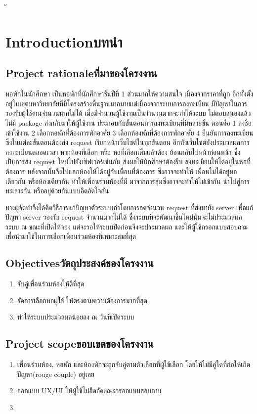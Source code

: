 ั\chapter{\ifenglish Introduction\else บทนำ\fi}

\section{\ifenglish Project rationale\else ที่มาของโครงงาน\fi}

หอพักในนักศึกษา เป็นหอพักที่นักศึกษาชั้นปีที่ 1 ส่วนมากให้ความสนใจ เนื่องจากราคาที่ถูก 
อีกทั้งตั้งอยู่ในเขตมหาวิทยาลัยที่มีโครงสร้างพื้นฐานมากมายแต่เนื่องจากระบบการลงทะเบียน
มีปัญหาในการรองรับผู้ใช้งานจำนวนมากไม่ได้ เมื่อมีจำนวนผู้ใช้งานเป็นจำนวนมากจะทำให้ระบบ
ไม่ตอบสนองแล้วไม่มี package ส่งกลับมาให้ผู้ใช้งาน ประกอบกับขั้นตอนการลงทะเบียนที่มีหลายขั้น
ตอนคือ 1 ลงชื่อเข้าใช้งาน 2 เลือกหอพักที่ต้องการพักอาศัย 3 เลือกห้องพักที่ต้องการพักอาศัย 
4 ยืนยันการลงทะเบียน ซึ่งในแต่ละขั้นตอนต้องส่ง request เรียกหน้าเว็บไซต์ในทุกขั้นตอน 
อีกทั้งเว็บไซต์ยังประมวลผลการลงทะเบียนตลอดเวลา หากห้องที่เลือก หรือ หอที่เลือกเต็มแล้วต้อง
ย้อนกลับไปหน้าก่อนหน้า ซึ่งเป็นการส่ง request ใหม่ไปยังเซิฟเวอร์เช่นกัน ส่งผลให้นักศึกษาต้องรีบ
ลงทะเบียนให้ได้อยู่ในหอที่ต้องการ หลังจากนั้นจึงไปแลกห้องให้ได้อยู่กับเพื่อนที่ต้องการ ซึ่งอาจจะทำให้
เพื่อนไม่ได้อยู่หอเดียวกัน หรือห้องเดียวกัน ทำให้เพื่อนร่วมห้องที่มี มาจากการสุ่มซึ่งอาจจะทำให้ไม่เข้ากัน
นำไปสู่การทะเลาะกัน หรืออยู่ด้วยกันแบบอึดอัดใจกัน

ทางผู้จัดทำจึงได้คิดวิธีการแก้ปัญหาตัวระบบเก่าโดยการลดจำนวน request ที่ส่งมายัง server เพื่อแก้ปัญหา 
server รองรับ request จำนวนมากไม่ได้ ซึ่งระบบที่จะพัฒนาขึ้นใหม่นั้นจะไม่ประมวลผลระบบ ณ ขณะที่เปิดให้จอง
แต่จะรอให้ระบบปิดก่อนจึงจะประมวลผล และให้ผู้ใช้กรอกแบบสอบถามเพื่อนำมาใช้ในการเลือกเพื่อนร่วมห้องที่เหมาะสมที่สุด

\section{\ifenglish Objectives\else วัตถุประสงค์ของโครงงาน\fi}
\begin{enumerate}
    \item จับคู่เพื่อนร่วมห้องให้ดีที่สุด
    \item จัดการเลือกหอผู้ใช้ ให้ตรงตามความต้องการมากที่สุด
    \item ทำให้ระบบประมวลผลน้อยลง ณ วันที่เปิดระบบ
\end{enumerate}

\section{\ifenglish Project scope\else ขอบเขตของโครงงาน\fi}
\begin{enumerate}
    \item เพื่อนร่วมห้อง, หอพัก และห้องพักจะถูกจับคู่ตามตัวเลือกที่ผู้ใช้เลือก
    โดยให้ไม่มีคู่ใดที่ก่อให้เกิดปัญหา(rouge couple) อยู่เลย
    \item ออกแบบ UX/UI ให้ผู้ใช้ไม่อึดอัดขณะกรอกแบบสอบถาม
    \item 
\end{enumerate}

